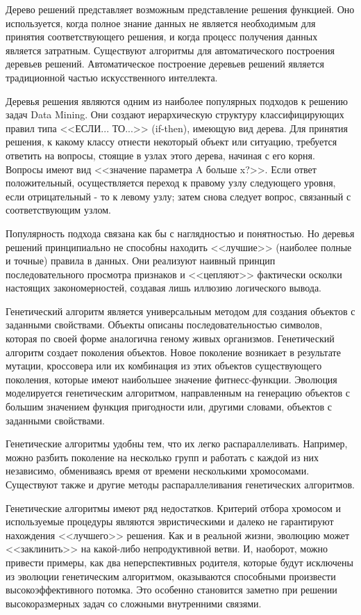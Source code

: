 Дерево решений представляет возможным представление решения функцией. Оно используется, когда полное знание данных 
не является необходимым для принятия соответствующего решения, и когда процесс получения данных является затратным. Существуют алгоритмы для автоматического построения деревьев решений. Автоматическое построение деревьев решений является традиционной частью искусственного интеллекта.

Деревья решения являются одним из наиболее популярных подходов к решению задач Data Mining. Они создают иерархическую структуру классифицирующих правил типа <<ЕСЛИ... ТО...>> (if-then), имеющую вид дерева. Для принятия решения, к какому классу отнести некоторый объект или ситуацию, требуется ответить на вопросы, стоящие в узлах этого дерева, начиная с его корня. Вопросы имеют вид <<значение параметра A больше x?>>. Если ответ положительный, осуществляется переход к правому узлу следующего уровня, если отрицательный - то к левому узлу; затем снова следует вопрос, связанный с соответствующим узлом.

Популярность подхода связана как бы с наглядностью и понятностью. Но деревья решений принципиально не способны находить <<лучшие>> (наиболее полные и точные) правила в данных. Они реализуют наивный принцип последовательного просмотра признаков и <<цепляют>> фактически осколки настоящих закономерностей, создавая лишь иллюзию логического вывода.

Генетический алгоритм является универсальным методом для создания объектов с заданными свойствами.
Объекты описаны последовательностью символов, которая по своей форме аналогична геному живых организмов. Генетический
 алгоритм создает поколения объектов. Новое поколение возникает в результате мутации, кроссовера или их комбинация из
 этих объектов существующего поколения, которые имеют наибольшее значение фитнесс-функции. Эволюция моделируется
  генетическим алгоритмом, направленным на генерацию объектов с большим значением функция пригодности или, другими
  словами, объектов с заданными свойствами.
  
Генетические алгоритмы удобны тем, что их легко распараллеливать. Например, можно разбить поколение на несколько групп и работать с каждой из них независимо, обмениваясь время от времени несколькими хромосомами. Существуют также и другие методы распараллеливания генетических алгоритмов.

Генетические алгоритмы имеют ряд недостатков. Критерий отбора хромосом и используемые процедуры являются эвристическими и далеко не гарантируют нахождения <<лучшего>> решения. Как и в реальной жизни, эволюцию может <<заклинить>> на какой-либо непродуктивной ветви. И, наоборот, можно привести примеры, как два неперспективных родителя, которые будут исключены из эволюции генетическим алгоритмом, оказываются способными произвести высокоэффективного потомка. Это особенно становится заметно при решении высокоразмерных задач со сложными внутренними связями.

